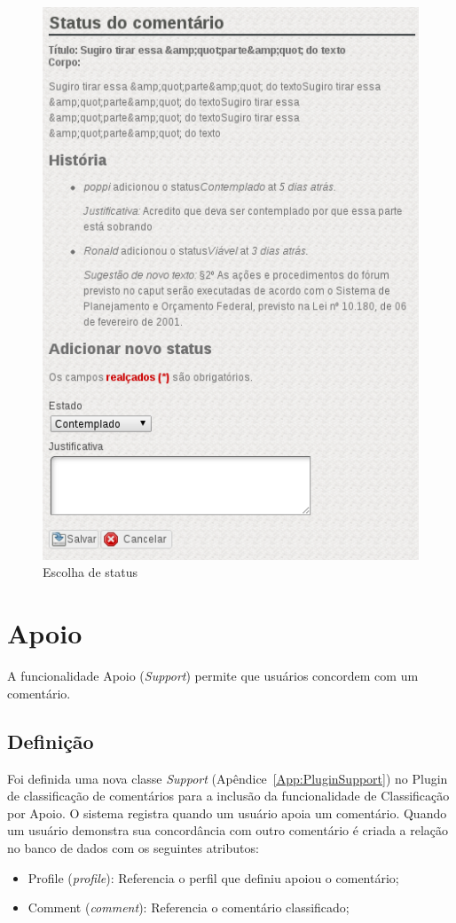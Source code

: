 \documentclass[11pt]{article}
\begin{document}
\begin{figure}[h]
\center
\includegraphics[scale=0.5]{new-status-page-and-history.png}
\caption{Escolha de status}
\label{fig:new-status-page-and-history}
\end{figure}

\section{Apoio}

A funcionalidade Apoio ({\it Support}) permite que usuários concordem com
um comentário.

\subsection{Definição}

Foi definida uma nova classe {\it Support}
(Apêndice~\ref{App:PluginSupport}) no Plugin de classificação de
comentários para a inclusão da funcionalidade de Classificação por
Apoio. O sistema registra quando um usuário apoia um comentário. Quando
um usuário demonstra sua concordância com outro comentário é criada a
relação no banco de dados com os seguintes atributos:
\begin{itemize}
  \item Profile ({\it profile}): Referencia o perfil que definiu apoiou
o comentário;
  \item Comment ({\it comment}): Referencia o comentário classificado;
\end{itemize}
\end{document}
